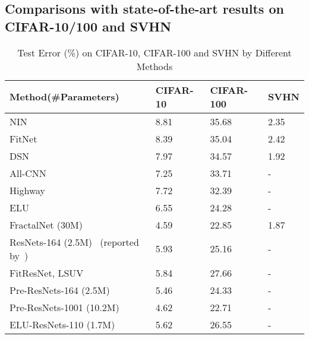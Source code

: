 \documentclass[journal]{IEEEtran}
\begin{document}
\subsection{Comparisons with state-of-the-art results on CIFAR-10/100 and SVHN}
\begin{table}[!t]
\renewcommand{\arraystretch}{1.3}
\caption{Test Error (\%) on CIFAR-10, CIFAR-100 and SVHN by Different Methods}
\label{tab:DFMethods}
\centering
\begin{tabular}{|p{3.5cm}|p{1.2cm}|p{1.2cm}|p{1.2cm}|}
\hline
Method(\#Parameters)           &CIFAR-10             &CIFAR-100      &SVHN \\ \hline\hline
NIN~\cite{lin2013NiN}                          &8.81                 &35.68          &2.35               \\\hline
FitNet~\cite{romero2014fitnets}                       &8.39                 &35.04          &2.42               \\\hline
DSN~\cite{lee2015dsn}                           &7.97                 &34.57          &1.92               \\\hline
All-CNN~\cite{springgenberg2014allcnn}                       &7.25                 &33.71          &-               \\\hline
Highway~\cite{sriva2015highway}                       &7.72                 &32.39          &-               \\\hline
ELU~\cite{clevert2015elu}                           &6.55                 &24.28          &-               \\\hline
FractalNet (30M)~\cite{larsson2016fractalnet}                    &4.59                 &22.85          &1.87               \\\hline\hline
ResNets-164 (2.5M)~\cite{he2015resnets} (reported by~\cite{he2016preresnets}) &5.93             &25.16          &-               \\\hline
FitResNet, LSUV~\cite{mishkin2015initial}               &5.84                 &27.66          &-               \\\hline
Pre-ResNets-164 (2.5M)~\cite{he2016preresnets}        &5.46                 &24.33          &-               \\\hline
Pre-ResNets-1001 (10.2M)~\cite{he2016preresnets}      &4.62                 &22.71          &-               \\\hline
ELU-ResNets-110 (1.7M)~\cite{shah2016elu}        &5.62                 &26.55          &-               \\\hline

\end{tabular}
\end{table}
\end{document}
